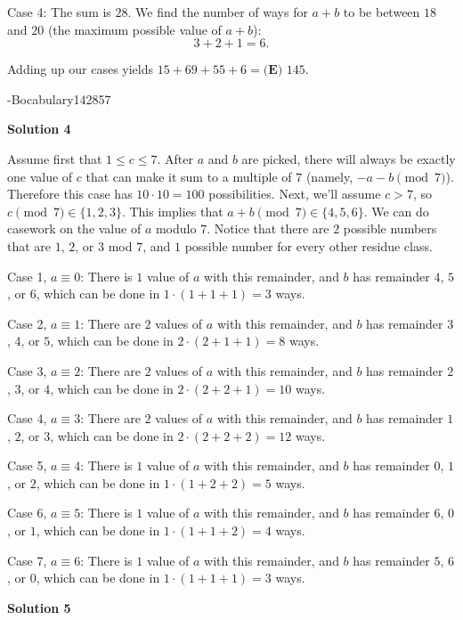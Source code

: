 \begin{enumerate}
 Case 4: The sum is $28.$ We find the number of ways for $a+b$ to be between $18$ and $20$ (the maximum possible value of $a+b$): 
 \[3+2+1=6.\]

 Adding up our cases yields $15+69+55+6=\boxed{\textbf{(E) }145}$.

 -Bocabulary142857

 



\textbf{Solution 4}

Assume first that $1 \le c \le 7$. After $a$ and $b$ are picked, there will always be exactly one value of $c$ that can make it sum to a multiple of $7$ (namely, $-a-b \pmod 7$). Therefore this case has $10 \cdot 10=100$ possibilities. Next, we'll assume $c>7$, so $c \pmod 7 \in \{ 1, 2, 3\}$. This implies that $a+b \pmod 7 \in \{ 4, 5, 6\}$. We can do casework on the value of $a$ modulo $7$. Notice that there are $2$ possible numbers that are $1$, $2$, or $3$ mod $7$, and $1$ possible number for every other residue class. 

 Case 1, $a \equiv 0$: There is $1$ value of $a$ with this remainder, and $b$ has remainder $4$, $5$, or $6$, which can be done in $1 \cdot (1+1+1)=3$ ways.

 Case 2, $a \equiv 1$: There are $2$ values of $a$ with this remainder, and $b$ has remainder $3$, $4$, or $5$, which can be done in $2 \cdot (2+1+1)=8$ ways.

 Case 3, $a \equiv 2$: There are $2$ values of $a$ with this remainder, and $b$ has remainder $2$, $3$, or $4$, which can be done in $2 \cdot (2+2+1)=10$ ways.

 Case 4, $a \equiv 3$: There are $2$ values of $a$ with this remainder, and $b$ has remainder $1$, $2$, or $3$, which can be done in $2 \cdot (2+2+2)=12$ ways.

 Case 5, $a \equiv 4$: There is $1$ value of $a$ with this remainder, and $b$ has remainder $0$, $1$, or $2$, which can be done in $1 \cdot (1+2+2)=5$ ways.

 Case 6, $a \equiv 5$: There is $1$ value of $a$ with this remainder, and $b$ has remainder $6$, $0$, or $1$, which can be done in $1 \cdot (1+1+2)=4$ ways.

 Case 7, $a \equiv 6$: There is $1$ value of $a$ with this remainder, and $b$ has remainder $5$, $6$, or $0$, which can be done in $1 \cdot (1+1+1)=3$ ways.

 


 



\textbf{Solution 5}


\end{enumerate}
